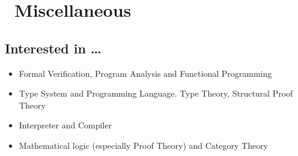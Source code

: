 \documentclass{resume}
\begin{document}

\section{\faInfo\ Miscellaneous}


\subsection{\textbf{Interested in …}}
\begin{itemize}
\item Formal Verification, Program Analysis and Functional Programming
\item Type System and Programming Language. Type Theory, Structural Proof Theory
\item Interpreter and Compiler
\item Mathematical logic (especially Proof Theory) and Category Theory
\end{itemize}

%
%
\end{document}
